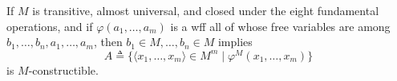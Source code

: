If $M$ is transitive, almost universal, and closed under the eight fundamental operations, and if $\varphi(a_1, \ldots, a_m)$ is a wff all of whose free variables are among $b_1, \ldots, b_n, a_1, \ldots, a_m$, then $b_1 \in M, \ldots, b_n \in M$ implies
$$A \triangleq \{\langle x_1, \ldots, x_m \rangle \in M^m \mid \varphi^M(x_1, \ldots, x_m)\}$$
is $M$-constructible.
